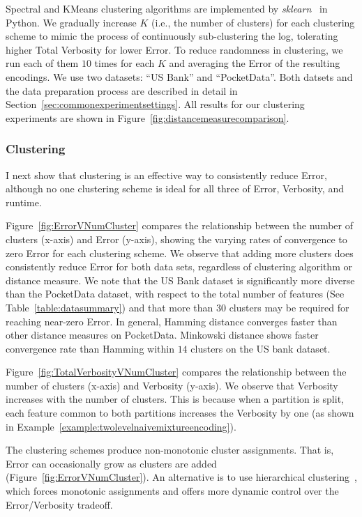 Spectral and KMeans clustering algorithms are implemented by \textit{sklearn}~\cite{scikit-learn} in Python. 
We gradually increase $K$ (i.e., the number of clusters) for each clustering scheme to mimic the process of continuously sub-clustering the log, tolerating higher Total Verbosity for lower Error.
To reduce randomness in clustering, we run each of them $10$ times for each $K$ and averaging the Error of the resulting encodings.  
We use two datasets: ``US Bank'' and ``PocketData''.  
Both datsets and the data preparation process are described in detail in Section~\ref{sec:commonexperimentsettings}. 
All results for our clustering experiments are shown in Figure~\ref{fig:distancemeasurecomparison}.

\subsubsection{Clustering}
\label{sec:clustering}
I next show that clustering is an effective way to consistently reduce Error, although no one clustering scheme is ideal for all three of Error, Verbosity, and runtime.

Figure~\ref{fig:ErrorVNumCluster} compares the relationship between the number of clusters (x-axis) and Error (y-axis), showing the varying rates of convergence to zero Error for each clustering scheme.
We observe that adding more clusters does consistently reduce Error for both data sets, regardless of clustering algorithm or distance measure.
We note that the US Bank dataset is significantly more diverse than the PocketData dataset, with respect to the total number of features (See Table~\ref{table:datasummary}) and that more than $30$ clusters may be required for reaching near-zero Error.
In general, Hamming distance converges faster than other distance measures on PocketData.
Minkowski distance shows faster convergence rate than Hamming within $14$ clusters on the US bank dataset. 

Figure~\ref{fig:TotalVerbosityVNumCluster} compares the relationship between the number of clusters (x-axis) and Verbosity (y-axis).
We observe that Verbosity increases with the number of clusters.
This is because when a partition is split, each feature common to both partitions increases the Verbosity by one (as shown in Example~\ref{example:twolevelnaivemixtureencoding}).

The clustering schemes produce non-monotonic cluster assignments. That is, Error can occasionally grow as clusters are added (Figure~\ref{fig:ErrorVNumCluster}). 
An alternative is to use hierarchical clustering~\cite{DBLP:journals/prl/Jain10}, which forces monotonic assignments and offers more dynamic control over the Error/Verbosity tradeoff.

